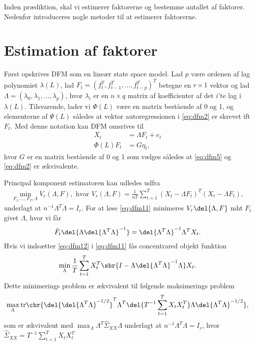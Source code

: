 Inden prædiktion, skal vi estimerer faktorerne og bestemme antallet af faktorer.
Nedenfor introduceres nogle metoder til at estimerer faktorerne.

\section{Estimation af faktorer}
Først opskrives DFM som en lineær state space model.
Lad $p$ være ordenen af lag polynomiet $\lambda(L)$, lad $F_t=(f_t^T,f_{t-1}^T,\ldots,f_{t-p}^T)^T$ betegne en $r \times 1$ vektor og lad $\Lambda=(\lambda_0,\lambda_1,\ldots,\lambda_p)$, hvor $\lambda_i$ er en $n \times q$ matrix af koefficienter af det $i$'te lag i $\lambda(L)$.
Tilsvarende, lader vi $\Phi(L)$ være en matrix bestående af 0 og 1, og elementerne af $\Psi(L)$ således at vektor autoregressionen i \eqref{eq:dfm2} er skrevet ift $F_t$.
Med denne notation kan DFM omsrives til
\begin{align}
X_t &= \Lambda F_t + e_t \label{eq:dfm4}\\
\Phi(L) F_t &= G \eta_t, \label{eq:dfm5}
\end{align}
hvor $G$ er en matrix bestående af 0 og 1 som vælges således at \eqref{eq:dfm5} og \eqref{eq:dfm2} er ækvivalente.

Principal komponent estimatoren kan udledes udfra 
\begin{align}
\min_{F_1,\ldots,F_T, \Lambda} V_r(\Lambda, F), \text{ hvor } V_r(\Lambda, F)=\frac{1}{nT} \sum_{t=1}^T(X_t-\Lambda F_t)^T(X_t - \Lambda F_t), \label{eq:dfm11}
\end{align}
underlagt at $n^{-1} \Lambda^T \Lambda = I_r$.
For at løse \eqref{eq:dfm11} minimeres $V_r\del{\Lambda,F}$ mht $F_t$ givet $\Lambda$, hvor vi får
\begin{align}
\hat{F}_t \del{\Lambda \del{\Lambda^T \Lambda}^{-1}}=\del{\Lambda^T \Lambda}^{-1} \Lambda^T X_t. \label{eq:dfm12}
\end{align}
Hvis vi indsætter \eqref{eq:dfm12} i \eqref{eq:dfm11} fås concentrared objekt funktion
\begin{align*}
\min_\Lambda \frac{1}{T} \sum_{t=1}^T X_t^T \sbr{I- \Lambda \del{\Lambda^T \Lambda}^{-1} \Lambda} X_t.
\end{align*}
Dette minimerings problem er ækvivalent til følgende maksimerings problem
\begin{align*}
\max_\Lambda \text{tr} \cbr{\del{\del{\Lambda^T \Lambda}^{-1/2}}^T \Lambda^T \del{T^{-1} \sum_{t=1}^T X_t X_t^T} \Lambda \del{\Lambda^T \Lambda}^{-1/2}},
\end{align*}
som er ækvivalent med $\max_\Lambda \Lambda^T \hat{\Sigma}_{XX} \Lambda$ underlagt at $n^{-1} \Lambda^T \Lambda=I_r$, hvor $\hat{\Sigma}_{XX}=T^{-1} \sum_{t=1}^T X_t X_t^T$

